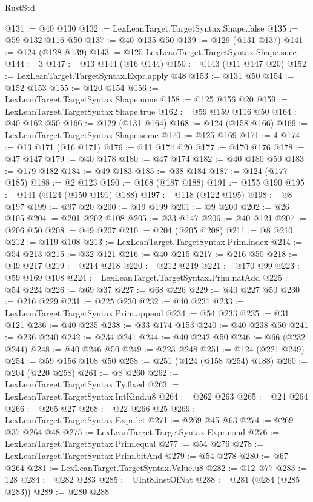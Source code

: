 \begin{lexlean}{RustStd}
\begin{coremodule}
@131 := @40 @130
@132 := LexLeanTarget.TargetSyntax.Shape.false
@135 := @59 @132 @116 @50
@137 := @40 @135 @50
@139 := @129 (@131 @137)
@141 := @124 (@128 @139)
@143 := @125 LexLeanTarget.TargetSyntax.Shape.succ
@144 := 3
@147 := @13 @144 (@16 @144)
@150 := @143 (@11 @147 @20)
@152 := LexLeanTarget.TargetSyntax.Expr.apply @48
@153 := @131 @50
@154 := @152 @153
@155 := @120 @154
@156 := LexLeanTarget.TargetSyntax.Shape.none
@158 := @125 @156 @20
@159 := LexLeanTarget.TargetSyntax.Shape.true
@162 := @59 @159 @116 @50
@164 := @40 @162 @50
@166 := @129 (@131 @164)
@168 := @124 (@158 @166)
@169 := LexLeanTarget.TargetSyntax.Shape.some
@170 := @125 @169
@171 := 4
@174 := @13 @171 (@16 @171)
@176 := @11 @174 @20
@177 := @170 @176
@178 := @47 @147
@179 := @40 @178
@180 := @47 @174
@182 := @40 @180 @50
@183 := @179 @182
@184 := @49 @183
@185 := @38 @184
@187 := @124 (@177 @185)
@188 := @2 @123
@190 := @168 (@187 @188)
@191 := @155 @190
@195 := @141 (@124 (@150 @191) @188)
@197 := @118 (@122 @195)
@198 := @8 @197
@199 := @97 @20
@200 := @19 @199
@201 := @9 @200
@202 := @26 @105
@204 := @201 @202 @108
@205 := @33 @147
@206 := @40 @121
@207 := @206 @50
@208 := @49 @207
@210 := @204 (@205 @208)
@211 := @8 @210
@212 := @119 @108
@213 := LexLeanTarget.TargetSyntax.Prim.index
@214 := @54 @213
@215 := @32 @121
@216 := @40 @215
@217 := @216 @50
@218 := @49 @217
@219 := @214 @218
@220 := @212 @219
@221 := @170 @99
@223 := @59 @169 @108
@224 := LexLeanTarget.TargetSyntax.Prim.natAdd
@225 := @54 @224
@226 := @69 @37
@227 := @68 @226
@229 := @40 @227 @50
@230 := @216 @229
@231 := @225 @230
@232 := @40 @231
@233 := LexLeanTarget.TargetSyntax.Prim.append
@234 := @54 @233
@235 := @31 @121
@236 := @40 @235
@238 := @33 @174 @153
@240 := @40 @238 @50
@241 := @236 @240
@242 := @234 @241
@244 := @40 @242 @50
@246 := @66 (@232 @244)
@248 := @40 @246 @50
@249 := @223 @248
@251 := @124 (@221 @249)
@254 := @59 @156 @108 @50
@258 := @251 (@124 (@158 @254) @188)
@260 := @204 (@220 @258)
@261 := @8 @260
@262 := LexLeanTarget.TargetSyntax.Ty.fixed
@263 := LexLeanTarget.TargetSyntax.IntKind.u8
@264 := @262 @263
@265 := @24 @264
@266 := @265 @27
@268 := @22 @266 @25
@269 := LexLeanTarget.TargetSyntax.Expr.let
@271 := @269 @45 @63
@274 := @269 @37 @264 @48
@275 := LexLeanTarget.TargetSyntax.Expr.cond
@276 := LexLeanTarget.TargetSyntax.Prim.equal
@277 := @54 @276
@278 := LexLeanTarget.TargetSyntax.Prim.bitAnd
@279 := @54 @278
@280 := @67 @264
@281 := LexLeanTarget.TargetSyntax.Value.u8
@282 := @12 @77
@283 := 128
@284 := @282 @283
@285 := UInt8.instOfNat
@288 := @281 (@284 (@285 @283))
@289 := @280 @288

\end{coremodule}
\end{lexlean}
